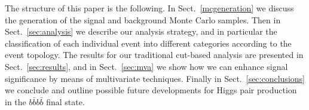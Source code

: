 The structure of this paper is the following.
%
In Sect.~\ref{mcgeneration} we discuss the generation of the signal
and background Monte Carlo samples.
%
Then in Sect.~\ref{sec:analysis}
we describe our analysis strategy, and in particular
the classification of each individual event into
different categories according to the event topology.
%
The results for our traditional cut-based analysis
are presented in Sect.~\ref{sec:results}, and in
Sect.~\ref{sec:mva} we show how we can enhance signal
significance by means of multivariate techniques.
%
Finally in Sect.~\ref{sec:conclusions} we conclude and outline
possible future developments for Higgs pair production
in the $b\bar{b}b\bar{b}$ final state.
